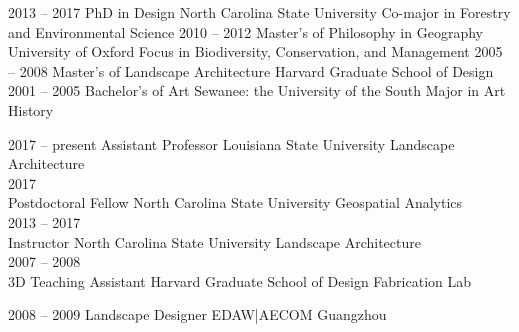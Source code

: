 \documentclass[10pt]{developercv} %
\begin{document}


\begin{entrylist}
	\entry
		{2013 -- 2017}
		{PhD in Design}
		{North Carolina State University}
		{Co-major in Forestry and Environmental Science}
	\entry
		{2010 -- 2012}
		{Master's of Philosophy in Geography} %
		{University of Oxford}
		{Focus in Biodiversity, Conservation, and Management}
	\entry
		{2005 -- 2008}
		{Master's of Landscape Architecture}
		{Harvard Graduate School of Design}
		{}
	\entry
		{2001 -- 2005}
		{Bachelor's of Art}
		{Sewanee: the University of the South}
		{Major in Art History}
\end{entrylist}



\begin{entrylist}
	\entry
		{2017 -- present}
		{Assistant Professor}
		{Louisiana State University}
		{Landscape Architecture\\
		}
	\entry
		{2017\\\footnotesize{}}
		{Postdoctoral Fellow}
		{North Carolina State University}
		{Geospatial Analytics\\
		}
	\entry
		{2013 -- 2017\\\footnotesize{}}
		{Instructor}
		{North Carolina State University}
		{Landscape Architecture\\
		}
	\entry
		{2007 -- 2008\\\footnotesize{}}
		{3D Teaching Assistant}
		{Harvard Graduate School of Design}
		{Fabrication Lab\\
		}
\end{entrylist}


\begin{entrylist}
	\entry
		{2008 -- 2009}
		{Landscape Designer}
		{EDAW|AECOM Guangzhou}
		{%
		}
\end{entrylist}
\end{document}
